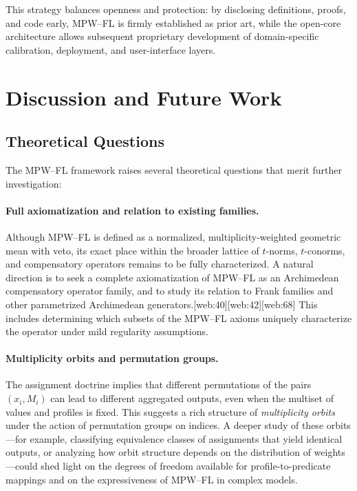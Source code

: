 \documentclass[11pt]{article}
\begin{document}
This strategy balances openness and protection: by disclosing definitions, proofs, and code early, MPW--FL is firmly established as prior art, while the open-core architecture allows subsequent proprietary development of domain-specific calibration, deployment, and user-interface layers.


\section{Discussion and Future Work}
\label{sec:discussion}

\subsection{Theoretical Questions}
\label{subsec:theoretical-questions}

The MPW--FL framework raises several theoretical questions that merit further investigation:

\paragraph{Full axiomatization and relation to existing families.}
Although MPW--FL is defined as a normalized, multiplicity-weighted geometric mean with veto, its exact place within the broader lattice of $t$-norms, $t$-conorms, and compensatory operators remains to be fully characterized. A natural direction is to seek a complete axiomatization of MPW--FL as an Archimedean compensatory operator family, and to study its relation to Frank families and other parametrized Archimedean generators.[web:40][web:42][web:68] This includes determining which subsets of the MPW--FL axioms uniquely characterize the operator under mild regularity assumptions.

\paragraph{Multiplicity orbits and permutation groups.}
The assignment doctrine implies that different permutations of the pairs $(x_i,M_i)$ can lead to different aggregated outputs, even when the multiset of values and profiles is fixed. This suggests a rich structure of \emph{multiplicity orbits} under the action of permutation groups on indices. A deeper study of these orbits---for example, classifying equivalence classes of assignments that yield identical outputs, or analyzing how orbit structure depends on the distribution of weights---could shed light on the degrees of freedom available for profile-to-predicate mappings and on the expressiveness of MPW--FL in complex models.
\end{document}
